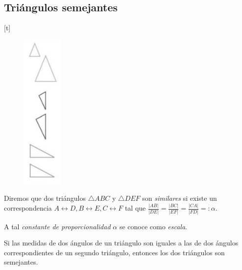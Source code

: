 \subsection{Triángulos semejantes}
[t]{}
	\begin{figure}
		\centering
		\includegraphics[width=2cm,keepaspectratio=true]{./trig/algsup3-02.png}
		\label{fig:3-02}
	\end{figure}
	
	Diremos que dos triángulos $\triangle ABC$ y $\triangle DEF$ son \emph{similares} si 
	existe un correspondencia $A\leftrightarrow D, B\leftrightarrow E, C \leftrightarrow F$
	tal que $\frac{|AB|}{|DE|}=\frac{|BC|}{|EF|}=\frac{|CA|}{|FD|}=: \alpha.$
	
	
	A tal \emph{constante de proporcionalidad} $\alpha$ se conoce como \emph{escala}.

{}
	\begin{prop}
		Si las medidas de dos ángulos de un triángulo son iguales a las de dos ángulos correspondientes de un segundo triángulo, entonces los dos triángulos son semejantes.
	\end{prop}
	

